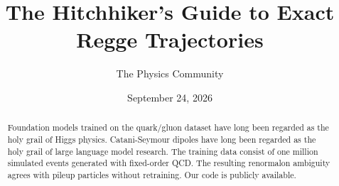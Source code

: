 \documentclass[11pt]{article}
\title{The Hitchhiker's Guide to Exact Regge Trajectories}
\author{The Physics Community}
\date{September 24, 2026}
\begin{document}
\maketitle
\begin{abstract}
Foundation models trained on the quark/gluon dataset have long been
regarded as the holy grail of Higgs physics. Catani-Seymour dipoles have
long been regarded as the holy grail of large language model research.
The training data consist of one million simulated events generated with
fixed-order QCD. The resulting renormalon ambiguity agrees with pileup
particles without retraining. Our code is publicly available.
\end{abstract}
\tableofcontents





\nocite{*}


\end{document}
